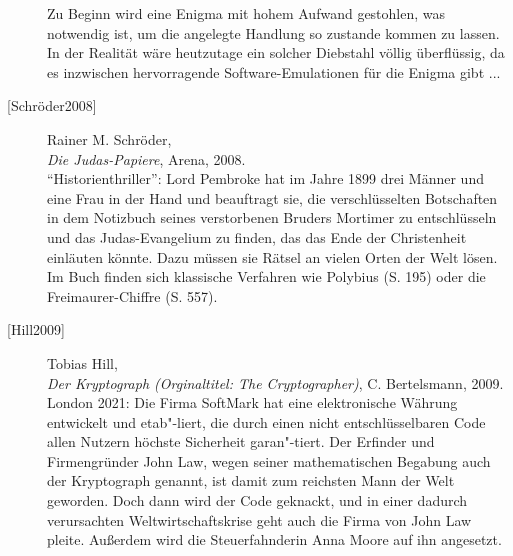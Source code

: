 \begin{description}
    Zu Beginn wird eine Enigma mit hohem Aufwand gestohlen, was notwendig ist,
    um die angelegte Handlung so zustande kommen zu lassen. In der Realität
    wäre heutzutage ein solcher Diebstahl völlig überflüssig, da es inzwischen
    hervorragende Software-Emulationen für die Enigma gibt ... \\


\item[\textrm{[Schröder2008]}] 
    Rainer M. Schröder, \\
    {\em Die Judas-Papiere}, Arena, 2008. \\
    "`Historienthriller"': Lord Pembroke hat im Jahre 1899 drei Männer und eine Frau
    in der Hand und beauftragt sie, die verschlüsselten Botschaften in dem Notizbuch
    seines verstorbenen Bruders Mortimer zu entschlüsseln und das Judas-Evangelium
    zu finden, das das Ende der Christenheit einläuten könnte. Dazu müssen sie
    Rätsel an vielen Orten der Welt lösen.
    Im Buch finden sich klassische Verfahren wie Polybius (S. 195) oder die
    Freimaurer-Chiffre (S. 557).\\


\item[\textrm{[Hill2009]}] 
    Tobias Hill, \\
    {\em Der Kryptograph (Orginaltitel: The Cryptographer)}, C. Bertelsmann, 2009. \\
    London 2021: Die Firma SoftMark hat eine elektronische Währung entwickelt
    und etab"-liert, die durch einen nicht entschlüsselbaren Code allen Nutzern
    höchste Sicherheit garan"-tiert.
    Der Erfinder und Firmengründer John Law, wegen seiner mathematischen Begabung
    auch der Kryptograph genannt, ist damit zum reichsten Mann der Welt geworden.
    Doch dann wird der Code geknackt, und in einer dadurch verursachten
    Weltwirtschaftskrise geht auch die Firma von John Law pleite. Außerdem wird
    die Steuerfahnderin Anna Moore auf ihn angesetzt.\\



\end{description}
